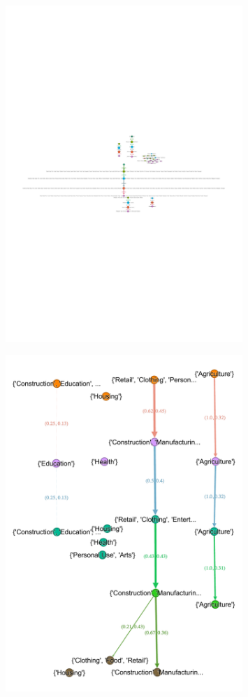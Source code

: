 \begin{figure}[H]
	\centering
	\includegraphics[width=0.8\textwidth]{images/LCountry.pdf}
	\caption{}
	\label{fig:LCountry}
\end{figure}

\begin{figure}[H]
	\centering
	\includegraphics[width=0.8\textwidth]{images/LSector.pdf}
	\caption{}
	\label{fig:LSector}
\end{figure}

